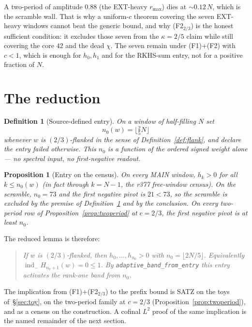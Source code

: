 \documentclass[11pt]{article}
\newtheorem{prop}{Proposition}
\newtheorem{definition}{Definition}
\theoremstyle{remark}
\newcommand{\indm}{\operatorname{ind}_{-}}
\begin{document}
A two-period of amplitude $0.88$ (the EXT-heavy $r_{\max}$) dies
at $\sim 0.12\,N$, which is the scramble wall.  That is why a
uniform-$c$ theorem covering the seven EXT-heavy windows cannot
beat the generic bound, and why (F2$_{2/3}$) is the honest
sufficient condition: it excludes those seven from the
$\kappa=2/5$ claim while still covering the core $42$ and the
dead $\chi$.  The seven remain under (F1)+(F2) with $c<1$, which
is enough for $h_0,h_1$ and for the RKHS-sum entry, not for a
positive fraction of $N$.

\section{The reduction}\label{sec:reduction}

\begin{definition}[Source-defined entry]\label{def:n0}
On a window of half-filling $N$ set
\[
n_0(w)=\lfloor \tfrac25 N\rfloor
\]
whenever $w$ is $(2/3)$-flanked in the sense of
Definition~\ref{def:flank}, and declare the entry failed
otherwise.  This $n_0$ is a function of the ordered signed
weight alone --- no spectral input, no first-negative readout.
\end{definition}

\begin{prop}[Entry on the census]\label{prop:entry}
On every MAIN window, $h_k>0$ for all $k\le n_0(w)$ (in fact
through $k=N-1$, the r377 free-window census).  On the scramble,
$n_0=73$ and the first negative pivot is $21<73$, so the
scramble is excluded by the premise of Definition~\ref{def:n0}
and by the conclusion.  On every two-period row of
Proposition~\ref{prop:twoperiod} at $c=2/3$, the first negative
pivot is at least $n_0$.
\end{prop}

The reduced lemma is therefore:

\begin{quote}
\emph{If $w$ is $(2/3)$-flanked, then $h_0,\ldots,h_{n_0}>0$ with
$n_0=\lfloor 2N/5\rfloor$.  Equivalently
$\indm H_{n_0+1}(w)=0\le 1$.  By
\texttt{adaptive\_band\_from\_entry} this entry activates the
rank-one band from $n_0$.}
\end{quote}

The implication from (F1)+(F2$_{2/3}$) to the prefix bound is
SATZ on the toys of~\S\ref{sec:toy}, on the two-period family
at $c=2/3$ (Proposition~\ref{prop:twoperiod}), and as a census
on the construction.  A cofinal $L^2$ proof of the same
implication is the named remainder of the next section.
\end{document}

